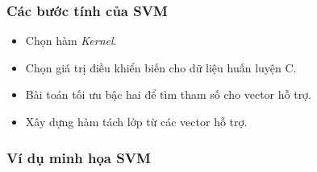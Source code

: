 \documentclass[a4paper, 12pt]{article}
\begin{document}
\subsubsection{Các bước tính của SVM}
\begin{itemize}
    \item Chọn hàm \textit{Kernel}.
	\item Chọn giá trị điều khiển biến cho dữ liệu huấn luyện C.
	\item Bài toán tối ưu bậc hai để tìm tham số cho vector hỗ trợ.
	\item Xây dựng hàm tách lớp từ các vector hỗ trợ.
\end{itemize}

\subsubsection{Ví dụ minh họa SVM}
\end{document}
